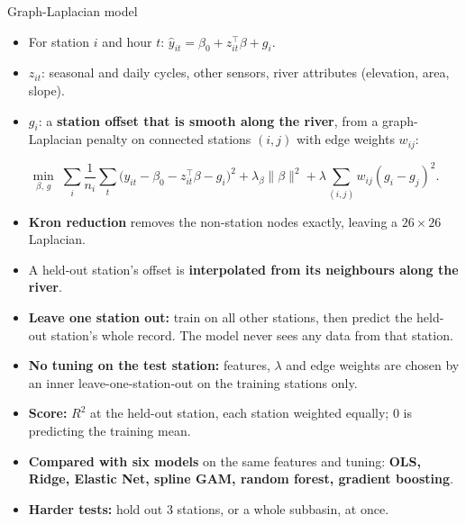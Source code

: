 \documentclass[final]{beamer}
\newlength{\colwidth}
\begin{document}
\begin{frame}[t]
\begin{columns}[t]
\begin{column}{\colwidth}
  \begin{block}{Graph-Laplacian model}
    \begin{itemize}
      \item For station $i$ and hour $t$: $\hat y_{it} = \beta_0 + z_{it}^\top\beta + g_i$.
      \item $z_{it}$: seasonal and daily cycles, other sensors, river attributes (elevation, area, slope).
      \item $g_i$: a \textbf{station offset that is smooth along the river}, from a graph-Laplacian
            penalty on connected stations $(i,j)$ with edge weights $w_{ij}$:
    \end{itemize}
    \[
      \min_{\beta,\,g}\; \sum_{i}\frac{1}{n_i}\sum_t \bigl(y_{it}-\beta_0-z_{it}^\top\beta-g_i\bigr)^2
      + \lambda_\beta\lVert\beta\rVert^2 + \lambda \sum_{(i,j)} w_{ij}(g_i-g_j)^2 .
    \]
    \begin{itemize}
      \item \textbf{Kron reduction} \cite{dorfler2013,kron1939} removes the non-station nodes
            exactly, leaving a $26\times26$ Laplacian.
      \item A held-out station's offset is \textbf{interpolated from its neighbours along the river}.
    \end{itemize}

    \begin{itemize}
      \item \textbf{Leave one station out:} train on all other stations, then predict the held-out
            station's whole record. The model never sees any data from that station.
      \item \textbf{No tuning on the test station:} features, $\lambda$ and edge weights are chosen
            by an inner leave-one-station-out on the training stations only.
      \item \textbf{Score:} $R^2$ at the held-out station, each station weighted equally; $0$ is
            predicting the training mean.
      \item \textbf{Compared with six models} on the same features and tuning: \textbf{OLS, Ridge,
            Elastic Net, spline GAM, random forest, gradient boosting}.
      \item \textbf{Harder tests:} hold out 3 stations, or a whole subbasin, at once.
    \end{itemize}
  \end{block}


\end{column}
\end{columns}
\end{frame}
\end{document}

